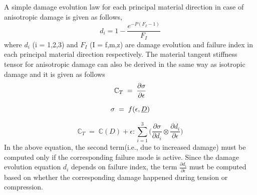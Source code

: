 \documentclass[a4paper,12pt,twoside]{report}
\begin{document}
A simple damage evolution law for each principal material direction in case of anisotropic damage is given as follows,
\begin{equation}
d_{i} = 1 - \frac{e^{-P(F_{I} - 1)} }{F_{I}}  
\label{exponential damage equation}
\end{equation}
where $d_{i}$ (i = 1,2,3) and $F_{I}$ (I = f,m,z) are damage evolution and failure index in each principal material direction respectively.
The material tangent stiffness tensor for anisotropic damage can also be derived in the same way as isotropic damage and it is given as follows
\begin{equation*}
\large{ \mathbb{C}_{T}  \; = \;\frac{\partial \sigma}{\partial \epsilon}  }
\end{equation*}

\begin{equation*}
\large{\sigma  \; = \; f(\epsilon, \underline{D}) }
\end{equation*}

\begin{equation}
\mathbb{C}_{T}  \; = \; \mathbb{C}(D) + \epsilon : \sum_{i = 1}^{3}  \Big( \frac{\partial \sigma }{\partial d_{i}} \otimes \frac{\partial d_{i}}{\partial \epsilon }\Big)
\label{Anisotropic tangent stiffness} 
\end{equation}
In the above equation, the second term(i.e., due to increased damage) must be computed only if the corresponding failure mode is active. Since the damage evolution equation $d_{i}$ depends on failure index, the term $\frac{\partial d_{i}}{\partial \epsilon }$ must be computed based on whether the corresponding damage happened during tension or compression.
\end{document}

